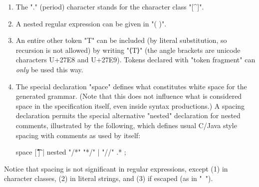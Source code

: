 \documentclass[11pt]{article} %
\begin{document}
\begin{manual}
\begin{enumerate}
  \item The "." (period) character stands for the character class "[^\n]".

  \item A nested regular expression can be given in "( )".

  \item An entire other token "T" can be included (by literal substitution, so recursion is not
    allowed) by writing "⟨T⟩" (the angle brackets are unicode characters U+27E8 and U+27E9). Tokens
    declared with "token fragment" can \emph{only} be used this way.

  \item The special declaration "space" defines what constitutes white space for the generated
    grammar. (Note that this does not influence what is considered space in the specification
    itself, even inside syntax productions.) A spacing declaration permits the special alternative
    "nested" declaration for nested comments, illustrated by the following, which defines usual
    C/Java style spacing with comments as used by \HAX itself:
\begin{hacs}[xleftmargin=\parindent]
space [ \t\f\r\n] | nested "/*" "*/" | "//" .* ;
\end{hacs}

  \end{enumerate}
  Notice that spacing is not significant in regular expressions, except (1) in character classes,
  (2) in literal strings, and (3) if escaped (as in "\ ").
\end{manual}
\end{document}
